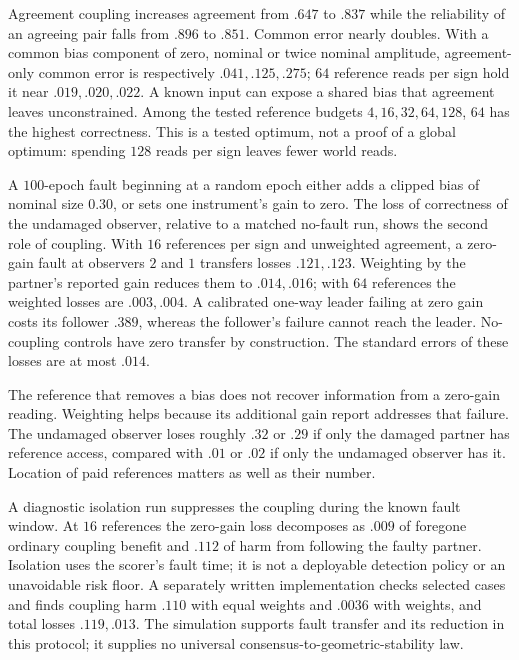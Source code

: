 Agreement coupling increases agreement from \(.647\) to \(.837\)
while the reliability of an agreeing pair falls from \(.896\) to
\(.851\). Common error nearly doubles. With a common bias component
of zero, nominal or twice nominal amplitude, agreement-only common
error is respectively \(.041,.125,.275\); \(64\) reference reads per
sign hold it near \(.019,.020,.022\). A known input can expose a
shared bias that agreement leaves unconstrained. Among the tested
reference budgets \(4,16,32,64,128\), \(64\) has the highest
correctness. This is a tested optimum, not a proof of a global
optimum: spending \(128\) reads per sign leaves fewer world reads.

A \(100\)-epoch fault beginning at a random epoch either adds a clipped
bias of nominal size \(0.30\), or sets one instrument's gain to zero.
The loss of correctness of the undamaged observer, relative to a
matched no-fault run, shows the second role of coupling.
With \(16\) references per sign and unweighted agreement, a zero-gain
fault at observers \(2\) and \(1\) transfers losses \(.121,.123\).
Weighting by the partner's reported gain reduces them to \(.014,.016\);
with \(64\) references the weighted losses are \(.003,.004\).
A calibrated one-way leader failing at zero gain costs its follower
\(.389\), whereas the follower's failure cannot reach the leader.
No-coupling controls have zero transfer by construction.
The standard errors of these losses are at most \(.014\).

The reference that removes a bias does not recover information from a
zero-gain reading. Weighting helps because its additional gain report
addresses that failure. The undamaged observer loses roughly \(.32\)
or \(.29\) if only the damaged partner has reference access, compared
with \(.01\) or \(.02\) if only the undamaged observer has it.
Location of paid references matters as well as their number.

A diagnostic isolation run suppresses the coupling during the known
fault window. At \(16\) references the zero-gain loss decomposes as
\(.009\) of foregone ordinary coupling benefit and \(.112\) of harm
from following the faulty partner. Isolation uses the scorer's fault
time; it is not a deployable detection policy or an unavoidable risk
floor. A separately written implementation checks selected cases and
finds coupling harm \(.110\) with equal weights and \(.0036\) with
weights, and total losses \(.119,.013\). The simulation supports fault
transfer and its reduction in this protocol; it supplies no universal
consensus-to-geometric-stability law.

